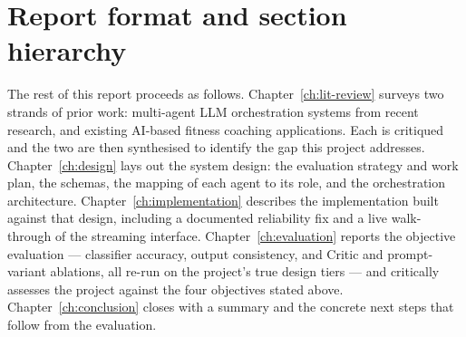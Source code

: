 \section{Report format and section hierarchy}

The rest of this report proceeds as follows. Chapter~\ref{ch:lit-review} surveys two strands of prior work: multi-agent LLM orchestration systems from recent research, and existing AI-based fitness coaching applications. Each is critiqued and the two are then synthesised to identify the gap this project addresses. Chapter~\ref{ch:design} lays out the system design: the evaluation strategy and work plan, the schemas, the mapping of each agent to its role, and the orchestration architecture. Chapter~\ref{ch:implementation} describes the implementation built against that design, including a documented reliability fix and a live walk-through of the streaming interface. Chapter~\ref{ch:evaluation} reports the objective evaluation --- classifier accuracy, output consistency, and Critic and prompt-variant ablations, all re-run on the project's true design tiers --- and critically assesses the project against the four objectives stated above. Chapter~\ref{ch:conclusion} closes with a summary and the concrete next steps that follow from the evaluation.
